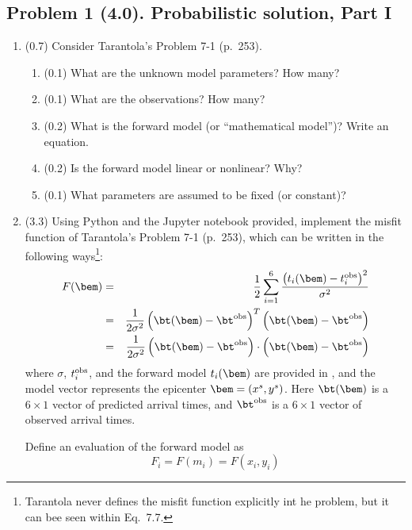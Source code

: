 \documentclass[11pt,titlepage,fleqn]{article}
\begin{document}

\pagebreak
\subsection*{Problem 1 (4.0). Probabilistic solution, Part I}

\begin{enumerate}
\item (0.7) Consider Tarantola's Problem 7-1 (p.~253).
%
\begin{enumerate}
\item (0.1) What are the unknown model parameters? How many?
\item (0.1) What are the observations? How many?
\item (0.2) What is the forward model (or ``mathematical model'')? Write an equation.
\item (0.2) Is the forward model linear or nonlinear? Why?
\item (0.1) What parameters are assumed to be fixed (or constant)?
\end{enumerate}


\item (3.3) Using Python and the Jupyter notebook provided, implement the misfit function of Tarantola's Problem 7-1 (p.~253), which can be written in the following ways\footnote{Tarantola never defines the misfit function explicitly int he problem, but it can bee seen within Eq.~7.7.}:
%
\begin{eqnarray}
F(\bem) &=& \frac{1}{2} \sum_{i=1}^6 \frac{\left(t_i(\bem) - t_i^{\rm obs}\right)^2}{\sigma^2}
\\
&=& \frac{1}{2\sigma^2} \left(\bt(\bem) - \bt^{\rm obs}\right)^T \left(\bt(\bem) - \bt^{\rm obs}\right)
\\
&=& \frac{1}{2\sigma^2} \left(\bt(\bem) - \bt^{\rm obs}\right) \cdot \left(\bt(\bem) - \bt^{\rm obs}\right)
\end{eqnarray}
%
where $\sigma$, $t_i^{\rm obs}$, and the forward model $t_i(\bem)$ are provided in \citet{Tarantola2005}, and the model vector represents the epicenter $\bem = (x^s,y^s)$. Here $\bt(\bem)$ is a $6 \times 1$ vector of predicted arrival times, and $\bt^{\rm obs}$ is a $6 \times 1$ vector of observed arrival times.

Define an evaluation of the forward model as
%
\begin{equation}
F_i = F(m_i) = F(x_i,y_i)
\end{equation}


\end{enumerate}
\end{document}
